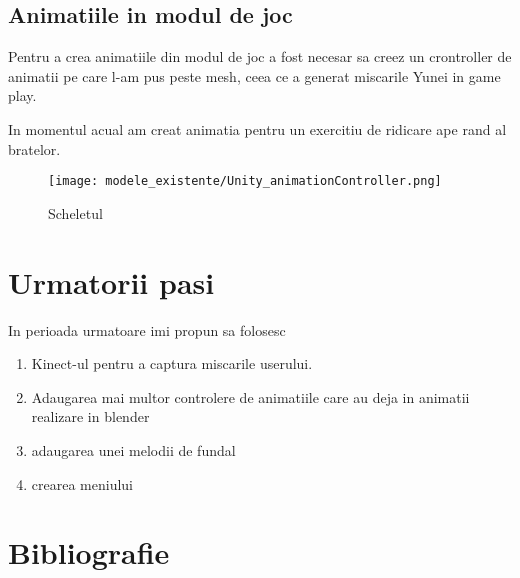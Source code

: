 \documentclass[12pt,a4paper]{report}
\begin{document}
\newpage

\section{Animatiile in modul de joc}

Pentru a crea animatiile din modul de joc a fost necesar sa creez un crontroller de animatii pe care l-am pus peste mesh, ceea ce a generat miscarile Yunei in game play.

In momentul acual am creat animatia pentru un exercitiu de ridicare ape rand al bratelor.

\begin{figure}[th]
\centering
\texttt{[image: modele\_existente/Unity\_animationController.png]} \caption[Scheletul]{Scheletul\protect\footnotemark}
  \label{figure_1:picture_10}
\end{figure}

\chapter{Urmatorii pasi}

In perioada urmatoare imi propun sa folosesc 
\begin{enumerate}
    \item Kinect-ul pentru a captura miscarile userului. 
    \item Adaugarea mai multor controlere de animatiile care au deja in animatii realizare in blender
    \item adaugarea unei melodii de fundal
    \item crearea meniului
\end{enumerate}



\chapter*{Bibliografie}  
% 
% 
\end{document}
